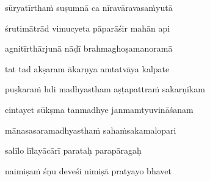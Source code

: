 sūryatīrthaṁ suṣumnā ca nīravāravasaṁyutā\thinspace{\dandab} \dontdisplaylinenum

śrutimātrād vimucyeta pāparāśir mahān api \veg\dontdisplaylinenum



agnitīrthārjunā nāḍī brahmaghoṣamanoramā\thinspace{\dandab} \dontdisplaylinenum

tat tad akṣaram ākarṇya amtatvāya kalpate \veg\dontdisplaylinenum



puṣkaraṁ hdi madhyastham aṣṭapattraṁ sakarṇikam\thinspace{\dandab} \dontdisplaylinenum

cintayet sūkṣma tanmadhye janmamtyuvināśanam \veg\dontdisplaylinenum



mānasasaramadhyasthaṁ sahaṁsakamalopari\thinspace{\dandab} \dontdisplaylinenum

salīlo līlayācārī parataḥ parapāragaḥ \veg\dontdisplaylinenum



naimiṣaṁ śṇu deveśi nimiṣā pratyayo bhavet\thinspace{\dandab} \dontdisplaylinenum

